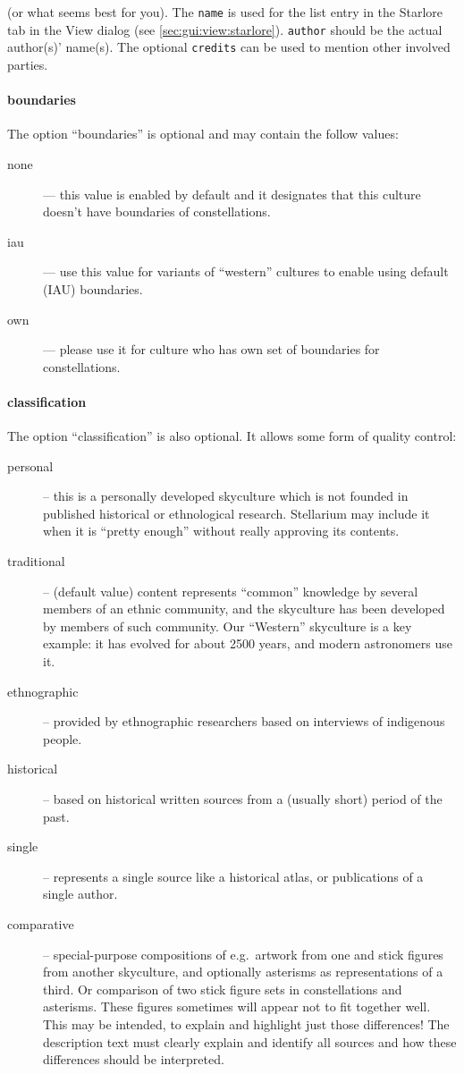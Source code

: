 \noindent (or what seems best for you). The \texttt{name} is used for the list entry in
the Starlore tab in the View dialog (see \ref{sec:gui:view:starlore}). \texttt{author} should be the actual author(s)' name(s). 
The optional \texttt{credits}  can be used to mention other involved parties. 

\paragraph{boundaries}
The option ``boundaries'' is optional and may contain the follow values:
\begin{description}
\item[none] --- this value is enabled by default and it designates that this culture doesn't have boundaries of constellations.
\item[iau] --- use this value for variants of ``western'' cultures to enable using default (IAU) boundaries.
\item[own] --- please use it for culture who has own set of boundaries for constellations.
\end{description}

\paragraph{classification}
The option ``classification'' is also optional.  It allows some form of quality control:
\begin{description}
  \item[personal] -- this is a personally developed skyculture which
    is not founded in published historical or ethnological research. Stellarium
    may include it when it is ``pretty enough'' without really
    approving its contents.
  \item[traditional] -- (default value) content represents ``common'' knowledge by
    several members of an ethnic community, and the skyculture has
    been developed by members of such community. Our ``Western''
    skyculture is a key example: it has evolved for about 2500 years,
    and modern astronomers use it.
  \item[ethnographic] -- provided by ethnographic researchers based on
    interviews of indigenous people.
  \item[historical] -- based on historical written sources from a
    (usually short) period of the past.
  \item[single] -- represents a single source like a historical atlas,
    or publications of a single author.
  \item[comparative] -- special-purpose compositions  of e.g.\ artwork
    from one and stick figures from another skyculture, and optionally
    asterisms as representations of a third. Or comparison of two
    stick figure sets in constellations and asterisms. These figures
    sometimes will appear not to fit together well. This may be
    intended, to explain and highlight just those differences! The
    description text must clearly explain and identify all sources and
    how these differences should be interpreted.
\end{description}

